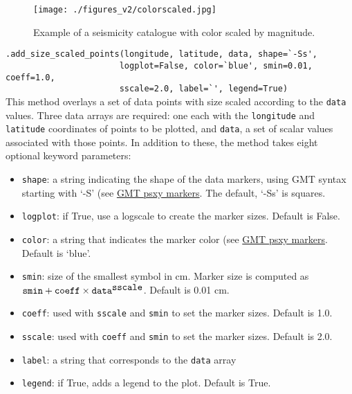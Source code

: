 \begin{figure}[htb]
  \centering
      \texttt{[image: ./figures\_v2/colorscaled.jpg]}
	\caption{Example of a seismicity catalogue with color scaled by magnitude.}
  \label{fig:cat_color_scaled}
\end{figure}


\noindent \verb;.add_size_scaled_points(longitude, latitude, data, shape=`-Ss',;\\
\verb;                       logplot=False, color=`blue', smin=0.01, coeff=1.0, ;\\
\verb;                       sscale=2.0, label=`', legend=True);\\

\noindent This method overlays a set of data points with size scaled according to the \verb=data= values. Three data arrays are required: one each with the \verb=longitude= and \verb=latitude= coordinates of points to be plotted, and \verb=data=, a set of scalar values associated with those points. In addition to these, the method takes eight optional keyword parameters:\\

\begin{itemize}
\item \verb=shape=: a string indicating the shape of the data markers, using GMT syntax starting with `-S' (see \href{https://docs.generic-mapping-tools.org/latest/psxy.html\#s}{GMT psxy markers}. The default, `-Ss' is squares.
\item \verb=logplot=: if True, use a logscale to create the marker sizes. Default is False.
\item \verb=color=: a string that indicates the marker color (see \href{https://docs.generic-mapping-tools.org/latest/psxy.html\#w}{GMT psxy markers}. Default is `blue'.
\item \verb=smin=: size of the smallest symbol in cm. Marker size is computed as\\ ${\verb=smin=}+{\verb=coeff=}\times {\verb=data=}^{\verb=sscale=}$. Default is 0.01 cm.
\item \verb=coeff=: used with \verb=sscale= and \verb=smin= to set the marker sizes. Default is 1.0.
\item \verb=sscale=: used with \verb=coeff= and \verb=smin= to set the marker sizes. Default is 2.0.
\item \verb=label=: a string that corresponds to the \verb=data= array
\item \verb=legend=: if True, adds a legend to the plot. Default is True. \\
\end{itemize}

